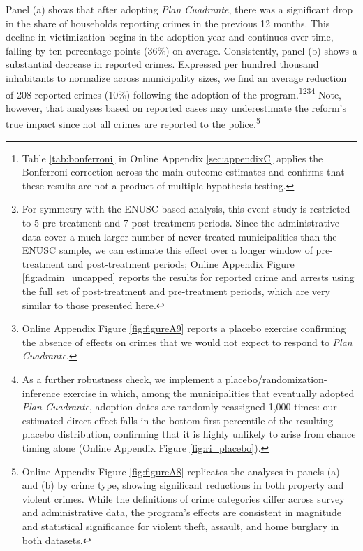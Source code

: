 Panel (a) shows that after adopting \emph{Plan Cuadrante}, there was a significant drop in the share of households reporting crimes in the previous 12 months. This decline in victimization begins in the adoption year and continues over time, falling by ten percentage points (36\%) on average. Consistently, panel (b) shows a substantial decrease in reported crimes. Expressed per hundred thousand inhabitants to normalize across municipality sizes, we find an average reduction of 208 reported crimes (10\%) following the adoption of the program.\footnote{Table \ref{tab:bonferroni} in Online Appendix \ref{sec:appendixC} applies the Bonferroni correction across the main outcome estimates and confirms that these results are not a product of multiple hypothesis testing.}\footnote{For symmetry with the ENUSC-based analysis, this event study is restricted to 5 pre-treatment and 7 post-treatment periods. Since the administrative data cover a much larger number of never-treated municipalities than the ENUSC sample, we can estimate this effect over a longer window of pre-treatment and post-treatment periods; Online Appendix Figure \ref{fig:admin_uncapped} reports the results for reported crime and arrests using the full set of post-treatment and pre-treatment periods, which are very similar to those presented here.}\footnote{Online Appendix Figure \ref{fig:figureA9} reports a placebo exercise confirming the absence of effects on crimes that we would not expect to respond to \emph{Plan Cuadrante}.}\footnote{As a further robustness check, we implement a placebo/randomization-inference exercise in which, among the municipalities that eventually adopted \emph{Plan Cuadrante}, adoption dates are randomly reassigned 1,000 times: our estimated direct effect falls in the bottom first percentile of the resulting placebo distribution, confirming that it is highly unlikely to arise from chance timing alone (Online Appendix Figure \ref{fig:ri_placebo}).} Note, however, that analyses based on reported cases may underestimate the reform's true impact since not all crimes are reported to the police.\footnote{Online Appendix Figure \ref{fig:figureA8} replicates the analyses in panels (a) and (b) by crime type, showing significant reductions in both property and violent crimes. While the definitions of crime categories differ across survey and administrative data, the program's effects are consistent in magnitude and statistical significance for violent theft, assault, and home burglary in both datasets.}

